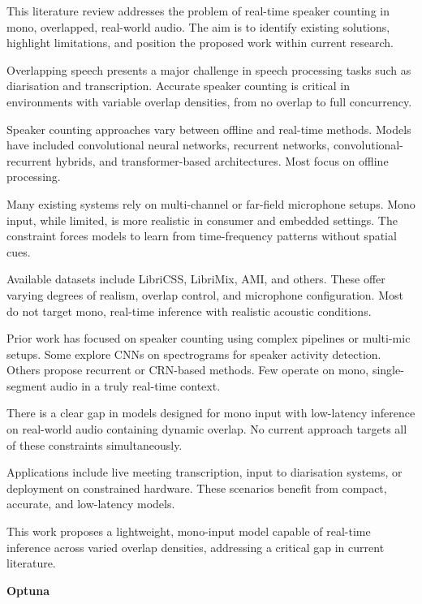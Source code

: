 This literature review addresses the problem of real-time speaker counting in mono, overlapped, real-world audio. The aim is to identify existing solutions, highlight limitations, and position the proposed work within current research.

Overlapping speech presents a major challenge in speech processing tasks such as diarisation and transcription. Accurate speaker counting is critical in environments with variable overlap densities, from no overlap to full concurrency.

Speaker counting approaches vary between offline and real-time methods. Models have included convolutional neural networks, recurrent networks, convolutional-recurrent hybrids, and transformer-based architectures. Most focus on offline processing.

Many existing systems rely on multi-channel or far-field microphone setups. Mono input, while limited, is more realistic in consumer and embedded settings. The constraint forces models to learn from time-frequency patterns without spatial cues.

Available datasets include LibriCSS, LibriMix, AMI, and others. These offer varying degrees of realism, overlap control, and microphone configuration. Most do not target mono, real-time inference with realistic acoustic conditions.

Prior work has focused on speaker counting using complex pipelines or multi-mic setups. Some explore CNNs on spectrograms for speaker activity detection. Others propose recurrent or CRN-based methods. Few operate on mono, single-segment audio in a truly real-time context.

There is a clear gap in models designed for mono input with low-latency inference on real-world audio containing dynamic overlap. No current approach targets all of these constraints simultaneously.

Applications include live meeting transcription, input to diarisation systems, or deployment on constrained hardware. These scenarios benefit from compact, accurate, and low-latency models.

This work proposes a lightweight, mono-input model capable of real-time inference across varied overlap densities, addressing a critical gap in current literature.


\textbf{Optuna}